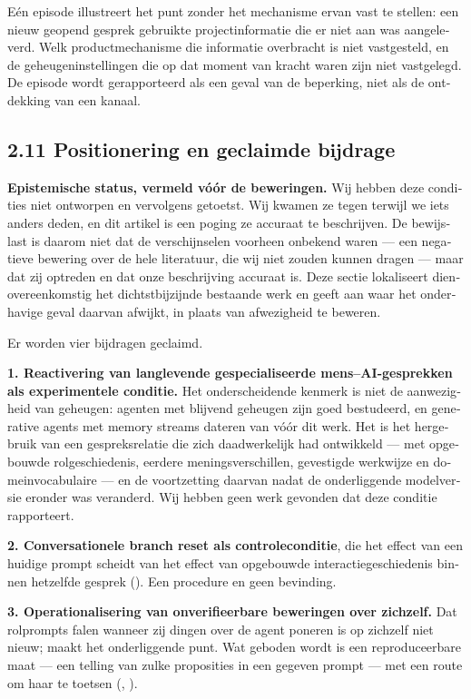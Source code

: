 \begin{dutch}
Eén episode illustreert het punt zonder het mechanisme ervan vast te stellen: een nieuw geopend gesprek gebruikte projectinformatie die er niet aan was aangeleverd. Welk productmechanisme die informatie overbracht is niet vastgesteld, en de geheugeninstellingen die op dat moment van kracht waren zijn niet vastgelegd. De episode wordt gerapporteerd als een geval van de beperking, niet als de ontdekking van een kanaal.


\subsection*{2.11 Positionering en geclaimde bijdrage}
\label{sec:nl:2.11}

\textbf{Epistemische status, vermeld vóór de beweringen.} Wij hebben deze condities niet ontworpen en vervolgens getoetst. Wij kwamen ze tegen terwijl we iets anders deden, en dit artikel is een poging ze accuraat te beschrijven. De bewijslast is daarom niet dat de verschijnselen voorheen onbekend waren — een negatieve bewering over de hele literatuur, die wij niet zouden kunnen dragen — maar dat zij optreden en dat onze beschrijving accuraat is. Deze sectie lokaliseert dienovereenkomstig het dichtstbijzijnde bestaande werk en geeft aan waar het onderhavige geval daarvan afwijkt, in plaats van afwezigheid te beweren.

Er worden vier bijdragen geclaimd.

\textbf{1. Reactivering van langlevende gespecialiseerde mens–AI-gesprekken als experimentele conditie.} Het onderscheidende kenmerk is niet de aanwezigheid van geheugen: agenten met blijvend geheugen zijn goed bestudeerd, en generative agents met memory streams dateren van vóór dit werk. Het is het hergebruik van een gespreksrelatie die zich daadwerkelijk had ontwikkeld — met opgebouwde rolgeschiedenis, eerdere meningsverschillen, gevestigde werkwijze en domeinvocabulaire — en de voortzetting daarvan nadat de onderliggende modelversie eronder was veranderd. Wij hebben geen werk gevonden dat deze conditie rapporteert.

\textbf{2. Conversationele branch reset als controleconditie}, die het effect van een huidige prompt scheidt van het effect van opgebouwde interactiegeschiedenis binnen hetzelfde gesprek (). Een procedure en geen bevinding.

\textbf{3. Operationalisering van onverifieerbare beweringen over zichzelf.} Dat rolprompts falen wanneer zij dingen over de agent poneren is op zichzelf niet nieuw;  maakt het onderliggende punt. Wat geboden wordt is een reproduceerbare maat — een telling van zulke proposities in een gegeven prompt — met een route om haar te toetsen (, ).


\end{dutch}
